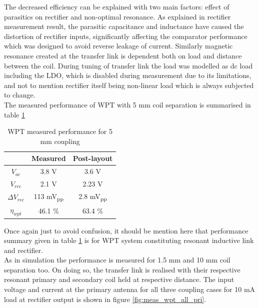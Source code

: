 \documentclass[12pt,a4paper,UKenglish]{report}
\begin{document}
  The decreased efficiency can be explained with two main factors: effect of parasitics on rectifier and non-optimal resonance. As explained in rectifier measurement result, the parasitic capacitance and inductance have caused the distortion of rectifier inputs, significantly affecting the comparator performance which was designed to avoid reverse leakage of current. Similarly magnetic resonance created at the transfer link is dependent both on load and distance between the coil. During tuning of transfer link the load was modelled as dc load including the LDO, which is disabled during measurement due to its limitations, and not to mention rectifier itself being non-linear load which is always subjected to change. \\
  
  The measured performance of WPT with 5 mm coil separation is summarised in table \ref{tab:wpt_spec_meas}
  
\begin{table}[H]
\caption{WPT measured performance  for 5 mm coupling} 
\begin{center}
\begin{tabular}{c|c|c}
\hline \hline
				& \textbf{Measured}				& \textbf{Post-layout} 	\\\hline \hline
$V_{ac}$			& 3.8 \si{\volt}					& 3.6 \si{\volt} \\ \hline
$V_{rec}$ 			& 2.1 \si{\volt}					& 2.23 V	\\ \hline
$\Delta V_{rec}$	& 113 \si{\milli\volt}\textsubscript{pp} 	& 2.8 \si{\milli\volt}\textsubscript{pp}		\\ \hline
$\eta_{wpt}$		& 46.1 \%						& 63.4 \%		\\ 
  
\hline \hline
\end{tabular}
\end{center}
\label{tab:wpt_spec_meas}
\end{table}%


 Once again just to avoid confusion, it should be mention here that performance summary given in table \ref{tab:wpt_spec_meas} is for WPT system constituting resonant inductive link and rectifier. \\
 
 As in simulation the performance is measured for 1.5 mm and 10 mm coil separation too. On doing so, the transfer link is realised with their respective resonant primary and secondary coil held at respective distance. The input voltage and current at the primary antenna for all three coupling cases for 10 mA load at rectifier output is shown in figure \ref{fig:meas_wpt_all_pri}. \\
 
\end{document}
